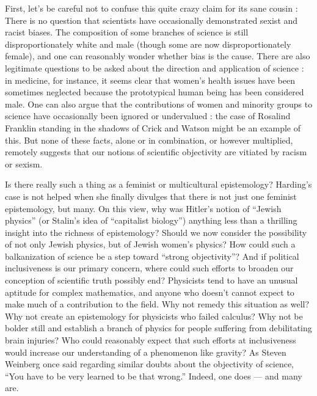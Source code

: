 \documentclass[a4paper,14pt]{extarticle}
\begin{document}
First, let's be careful not to confuse this quite crazy claim for its sane cousin :
There is no question that scientists have occasionally demonstrated sexist and racist biases.
The composition of some branches of science is still disproportionately white and male (though some are now disproportionately female), and one can reasonably wonder whether bias is the cause.
There are also legitimate questions to be asked about the direction and application of science :
in medicine, for instance, it seems clear that women's health issues have been sometimes neglected because the prototypical human being has been considered male.
One can also argue that the contributions of women and minority groups to science have occasionally been ignored or undervalued :
the case of Rosalind Franklin standing in the shadows of Crick and Watson might be an example of this.
But none of these facts, alone or in combination, or however multiplied, remotely suggests that our notions of scientific objectivity are vitiated by racism or sexism.

Is there really such a thing as a feminist or multicultural epistemology?
Harding's case is not helped when she finally divulges that there is not just one feminist epistemology, but many.
On this view, why was Hitler's notion of ``Jewish physics'' (or Stalin's idea of ``capitalist biology'') anything less than a thrilling insight into the richness of epistemology?
Should we now consider the possibility of not only Jewish physics, but of Jewish women's physics?
How could such a balkanization of science be a step toward ``strong objectivity''?
And if political inclusiveness is our primary concern, where could such efforts to broaden our conception of scientific truth possibly end?
Physicists tend to have an unusual aptitude for complex mathematics, and anyone who doesn't cannot expect to make much of a contribution to the field.
Why not remedy this situation as well?
Why not create an epistemology for physicists who failed calculus?
Why not be bolder still and establish a branch of physics for people suffering from debilitating brain injuries?
Who could reasonably expect that such efforts at inclusiveness would increase our understanding of a phenomenon like gravity?
As Steven Weinberg once said regarding similar doubts about the objectivity of science, ``You have to be very learned to be that wrong.''
Indeed, one does --- and many are.
\end{document}
